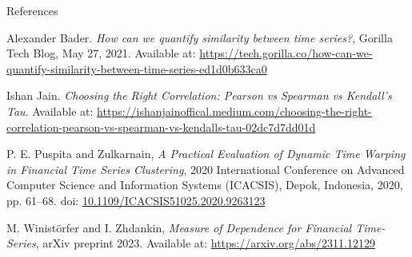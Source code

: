 \documentclass[10pt]{beamer}
\begin{document}
\begin{frame}{References}
\scriptsize
\begin{thebibliography}{9}

Alexander Bader. \textit{How can we quantify similarity between time series?}, Gorilla Tech Blog, May 27, 2021.  
Available at: \url{https://tech.gorilla.co/how-can-we-quantify-similarity-between-time-series-ed1d0b633ca0}

Ishan Jain. \textit{Choosing the Right Correlation: Pearson vs Spearman vs Kendall’s Tau}.  
Available at: \url{https://ishanjainoffical.medium.com/choosing-the-right-correlation-pearson-vs-spearman-vs-kendalls-tau-02dc7d7dd01d}

P. E. Puspita and Zulkarnain, 
\textit{A Practical Evaluation of Dynamic Time Warping in Financial Time Series Clustering},  
2020 International Conference on Advanced Computer Science and Information Systems (ICACSIS), Depok, Indonesia, 2020, pp. 61–68.  
doi: \href{https://doi.org/10.1109/ICACSIS51025.2020.9263123}{10.1109/ICACSIS51025.2020.9263123}

M. Winistörfer and I. Zhdankin, 
\textit{Measure of Dependence for Financial Time-Series},  
arXiv preprint 2023.  
Available at: \url{https://arxiv.org/abs/2311.12129}

\end{thebibliography}
\end{frame}
\end{document}

